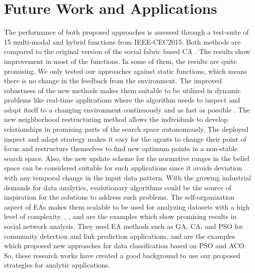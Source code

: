\section{Future Work and Applications}
The performance of both proposed approaches is assessed through a test-suite of 15 multi-modal and hybrid functions from IEEE-CEC2015. Both methods are compared to the original version of the social fabric based CA \citet{ali2016leveraged}. The results show improvement in most of the functions. In some of them, the results are quite promising. \newline
We only tested our approaches against static functions, which means there is no change in the feedback from the environment. The improved robustness of the new methods makes them suitable to be utilized in dynamic problems like real-time applications where the algorithm needs to inspect and adapt itself to a changing environment continuously and as fast as possible \cite{che2010robust}. The new neighborhood restructuring method allows the individuals to develop relationships in promising parts of the search space autonomously. The deployed inspect and adapt strategy makes it easy for the agents to change their point of focus and restructure themselves to find new optimum points in a non-stable search space. Also, the new update scheme for the normative ranges in the belief space can be considered suitable for such applications since it avoids deviation with any temporal change in the input data pattern.\newline
With the growing industrial demands for data analytics, evolutionary algorithms could be the source of inspiration for the solutions to address such problems. The self-organization aspect of EAs makes them scalable to be used for analyzing datasets with a high level of complexity. \cite{xiaodong2008web}, \cite{pizzuti2008ga}, and \cite{sherkat2015structural} are the examples which show promising results in social network analysis. They used EA methods such as GA, CA, and PSO for community detection and link prediction applications. \cite{sousa2004particle} and \cite{otero2012inducing} are the examples which proposed new approaches for data classification based on PSO and ACO. So, these research works have created a good background to use our proposed strategies for analytic applications. 


